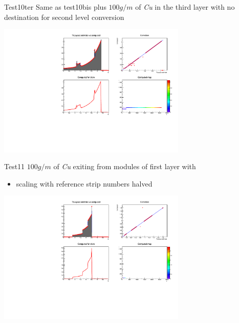 \documentclass[pdftex, 11pt]{beamer}
\begin{document}
\begin{frame}
  \begin{block}{Test10ter}
    Same as test10bis plus \alert{$100 g/m$} of \emph{Cu}
    in the third layer with no destination for second level conversion
  \end{block}
  \begin{center}
    \includegraphics[width=9cm]{img/test10ter.pdf}
  \end{center}
\end{frame}

\begin{frame}
  \begin{block}{Test11}
    \alert{$100 g/m$} of \emph{Cu} exiting from modules of first layer with
    \begin{itemize}
    \item \alert{scaling} with reference \alert{strip numbers} halved
    \end{itemize}
  \end{block}
  \begin{center}
    \includegraphics[width=9cm]{img/test11.pdf}
  \end{center}
\end{frame}
\end{document}
